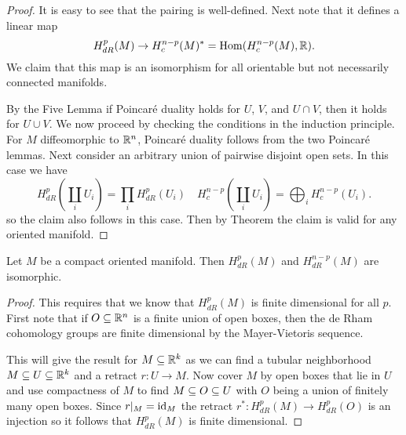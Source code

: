 \begin{proof}
It is easy to see that the pairing is well-defined. Next note that it defines a
linear map
\[H^p_{dR}(M)\to H^{n-p}_c(M)^*=\mathrm{Hom}(H^{n-p}_c(M),\mathbb{R}).\]
We claim that this map is an isomorphism for all orientable but not necessarily connected
manifolds.\par
By the Five Lemma if Poincar\'e duality holds for $U$, $V$, and $U\cap V$, then it holds for $U\cup V$. We now proceed by checking the conditions in the induction principle. 
For $M$ diffeomorphic to $\mathbb{R}^n$, Poincar\'e duality follows from the two Poincar\'e lemmas. Next consider an arbitrary union of pairwise disjoint open sets. In this case we have
\[H^p_{dR}(\coprod_iU_i)=\prod_iH^p_{dR}(U_i)\quad H^{n-p}_c(\coprod_iU_i)=\bigoplus_iH^{n-p}_c(U_i).\]
so the claim also follows in this case. Then by Theorem the claim is valid for any oriented manifold.
\end{proof}
\begin{corollary}
Let $M$ be a compact oriented manifold. Then $H^p_{dR}(M)$ and $H^{n-p}_{dR}(M)$ are isomorphic.
\end{corollary}
\begin{proof}
This requires that we know that $H^p_{dR}(M)$ is finite dimensional for all $p$. First note that if $O\subseteq\mathbb{R}^n$ is a finite union of open boxes, then the de Rham cohomology 
groups are finite dimensional by the Mayer-Vietoris sequence.\par
This will give the result for $M\subseteq\mathbb{R}^k$ as we can find a tubular neighborhood $M\subseteq U\subseteq\mathbb{R}^k$ and a retract $r:U\to M$. Now cover $M$ by open boxes that lie in $U$ 
and use compactness of $M$ to find $M\subseteq O\subseteq U$ with $O$ being a union of finitely many open boxes. Since $r|_M=\mathrm{id}_M$ the retract $r^*:H^p_{dR}(M)\to H^p_{dR}(O)$ is 
an injection so it follows that $H^p_{dR}(M)$ is finite dimensional.
\end{proof}
